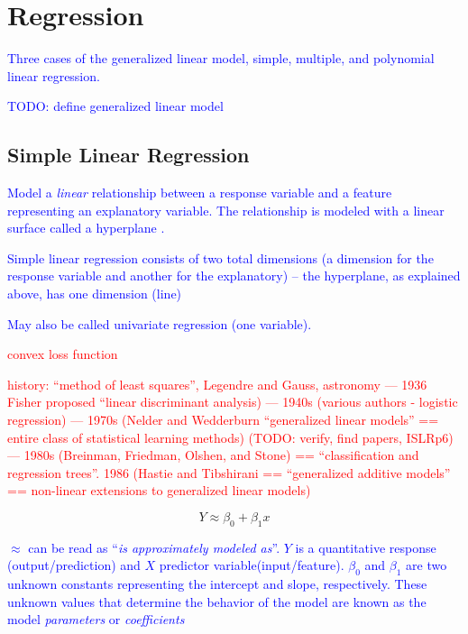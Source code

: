 \section{Regression}

\textcolor{blue}{Three cases of the {generalized linear model}, simple, multiple, and polynomial linear regression.}

\textcolor{blue}{TODO: define generalized linear model}

\subsection{Simple Linear Regression}

\textcolor{blue}{Model a \emph{linear} relationship between a response variable and a feature representing an explanatory variable. The relationship is modeled with a linear surface called a hyperplane \ALR.}

\textcolor{blue}{Simple linear regression consists of two total dimensions (a dimension for the response variable and another for the explanatory) -- the hyperplane, as explained above, has one dimension (line)}

\textcolor{blue}{May also be called univariate regression (one variable).}

\textcolor{red}{convex loss function}

\textcolor{red}{history: ``method of least squares'', Legendre and Gauss, astronomy --- 1936 Fisher proposed ``linear discriminant analysis) --- 1940s (various authors - logistic regression) --- 1970s (Nelder and Wedderburn ``generalized linear models'' == entire class of statistical learning methods) (TODO: verify, find papers, ISLRp6) --- 1980s (Breinman, Friedman, Olshen, and Stone) == ``classification and regression trees''. 1986 (Hastie and Tibshirani == ``generalized additive models'' == non-linear extensions to generalized linear models)}

\begin{equation}
{Y \approx \beta_0 + \beta_1 x}
\label{eq:slr_ex}
\end{equation}

\textcolor{blue}{$\approx$ can be read as ``\emph{is approximately modeled as}''. $Y$ is a quantitative response (output/prediction) and $X$ predictor variable(input/feature). $\beta_0$ and $\beta_1$ are two unknown constants representing the intercept and slope, respectively. These unknown values that determine the behavior of the model are known as the model \emph{parameters} or \emph{coefficients}}

